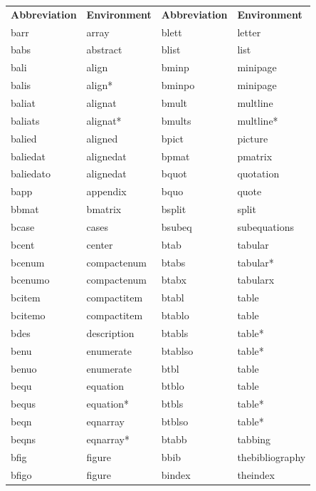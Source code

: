 \documentclass[11pt]{article}
\begin{document}
\begin{table}
\small
\centering
\begin{tabular}{llll}
\textbf{Abbreviation} & \textbf{Environment} & \textbf{Abbreviation} & \textbf{Environment} \\
\cmidrule[0.5pt](lr){1-1} \cmidrule[0.5pt](lr){2-2} \cmidrule[0.5pt](lr){3-3} \cmidrule[0.5pt](lr){4-4}
barr      & array       & blett   & letter \\
babs      & abstract    & blist   & list \\
bali      & align       & bminp   & minipage \\
balis     & align*      & bminpo  & minipage \\
baliat    & alignat     & bmult   & multline \\
baliats   & alignat*    & bmults  & multline* \\
balied    & aligned     & bpict   & picture \\
baliedat  & alignedat   & bpmat   & pmatrix \\
baliedato & alignedat   & bquot   & quotation \\
bapp      & appendix    & bquo    & quote \\
bbmat     & bmatrix     & bsplit  & split \\
bcase     & cases       & bsubeq  & subequations \\
bcent     & center      & btab    & tabular \\
bcenum    & compactenum & btabs   & tabular* \\
bcenumo   & compactenum & btabx   & tabularx \\
bcitem    & compactitem & btabl   & table \\
bcitemo   & compactitem & btablo  & table \\
bdes      & description & btabls  & table* \\
benu      & enumerate   & btablso & table* \\
benuo     & enumerate   & btbl    & table \\
bequ      & equation    & btblo   & table \\
bequs     & equation*   & btbls   & table* \\
beqn      & eqnarray    & btblso  & table* \\
beqns     & eqnarray*   & btabb   & tabbing \\
bfig      & figure      & bbib    & thebibliography \\
bfigo     & figure      & bindex  & theindex \\

\end{tabular}
\end{table}
\end{document}
